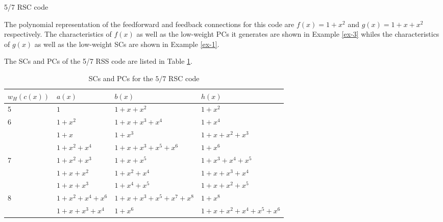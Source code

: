 \begin{example} {5/7 RSC code}

The polynomial representation of the feedforward and feedback connections for this code are $f(x)=1+x^2$ and $g(x)=1+x+x^2$ respectively. The characteristics of $f(x)$ as well as the low-weight PCs it generates are shown in Example \ref{ex-3}  whiles the characteristics of $g(x)$ as well as the low-weight SCs are shown in  Example \ref{ex-1}.

The SCs and PCs of the 5/7 RSS code are listed in Table \ref{novelTab13}. 
\begin{table}[htbp]
	\caption{SCs and PCs for the $5/7$ RSC code}
	\centering
	\begin{tabularx}{0.75\textwidth}{Xlll} 
		\hline
		$w_H(c(x))$& $a(x)$ & $b(x)$ & $h(x)$ \\ %
		\hline\hline
		5&$1$ & $1+x+x^{2}$ & $1+x^2$\\
		\hline\hline
		6&$1+x^2$ & $1+x+x^3+x^4$ & $1+x^{4}$\\
		&$1+x$ & $1+x^3$ & $1+x+x^2+x^3$\\
		\hline\hline
		&$1+x^2+x^4$ & $1+x+x^3+x^5+x^6$ & $1+x^{6}$\\
		7&$1+x^2+x^3$ & $1+x+x^5$ & $1+x^3+x^4+x^5$\\
		&$1+x+x^2$ & $1+x^2+x^4$ & $1+x+x^3+x^4$\\
		&$1+x+x^3$ & $1+x^4+x^5$ & $1+x+x^2+x^5$\\
		\hline \hline
		8&$1+x^2+x^4+x^6$ & $1+x+x^3+x^5+x^7+x^8$ & $1+x^8$\\
		&$1+x+x^3+x^4$ & $1+x^6$ & $1+x+x^2+x^4+x^5+x^6$\\
		\hline
	\end{tabularx}
	
	\label{novelTab13}
\end{table}


\end{example}
